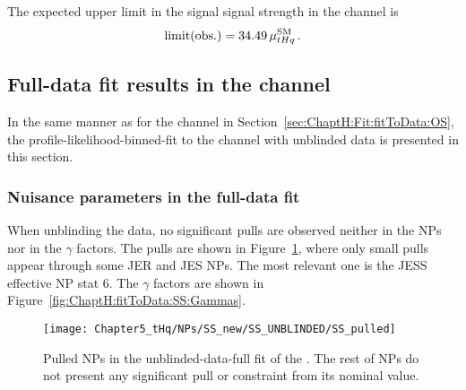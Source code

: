 
The expected upper limit in the signal \tHq signal strength in the \dilepOStau channel is
\begin{equation*}
	\text{limit(obs.)} = 34.49 \,\mu^{\text{SM}}_{\tHq} \, .  %
\end{equation*}


\FloatBarrier
\subsection{Full-data fit results in the \dilepSStau channel}
\label{sec:ChaptH:Fit:fitToData:SS}
In the same manner as for the \dilepOS channel in Section~\ref{sec:ChaptH:Fit:fitToData:OS},
the profile-likelihood-binned-fit to the \dilepSStau channel with unblinded data is presented
in this section.

\subsubsection{Nuisance parameters in the \dilepSStau full-data fit}
\label{sec:ChaptH:Fit:FullFit:SS:NPs}
When unblinding the data, no significant pulls are observed neither in the NPs
nor in the $\gamma$ factors. 
The pulls are shown in Figure~\ref{fig:ChaptH:fitToData:SS:PulledNPs}, where
only small pulls appear through some JER and JES NPs. The most relevant one
is the JESS effective NP stat 6.
The  $\gamma$ factors are shown in Figure~\ref{fig:ChaptH:fitToData:SS:Gammas}. 


\begin{figure}[h]
\centering
\texttt{[image: Chapter5\_tHq/NPs/SS\_new/SS\_UNBLINDED/SS\_pulled]}
\caption{Pulled NPs in the unblinded-data-full fit of the \dilepSStau. 
The rest of NPs do not present any significant pull or constraint from its nominal value.}  
\label{fig:ChaptH:fitToData:SS:PulledNPs}
\end{figure}

